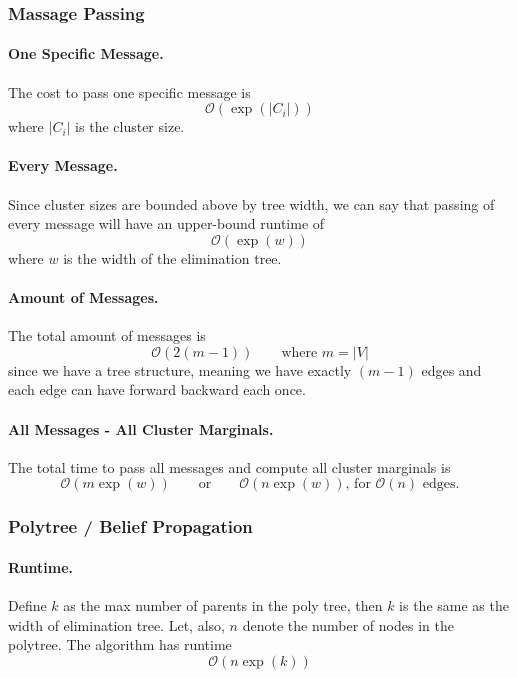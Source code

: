 \documentclass[11pt]{article}
\begin{document}
\subsubsection{Massage Passing}
\paragraph{One Specific Message.} The cost to pass one specific message is
\begin{equation}
	\mathcal O (\exp ( |C_i|)) 
\end{equation}
where $|C_i|$ is the cluster size. 

\paragraph{Every Message.} Since cluster sizes are bounded above by tree width, we can say that passing of every message will have an upper-bound runtime of
\begin{equation}
	\mathcal O ( \exp (w) )
\end{equation}
where $w$ is the width of the elimination tree. 

\paragraph{Amount of Messages.} The total amount of messages is 
\begin{equation}
	\mathcal O (2 (m - 1)) \quad \quad \text{where $m = |V|$}
\end{equation}
since we have a tree structure, meaning we have exactly $(m - 1)$ edges and each edge can have forward backward each once. 

\paragraph{All Messages - All Cluster Marginals.} The total time to pass all messages and compute all cluster marginals is 
\begin{equation}
	\mathcal O (m \exp (w)) \quad \quad \text{or} \quad \quad \mathcal O (n \exp( w))\text{, for $\mathcal O (n)$ edges.} 
\end{equation}

\subsubsection{Polytree / Belief Propagation}
\paragraph{Runtime.} Define $k$ as the max number of parents in the poly tree, then $k$ is the same as the width of elimination tree. Let, also, $n$ denote the number of nodes in the polytree. The algorithm has runtime 
\begin{equation}
	\mathcal O (n \exp (k))
\end{equation}
\end{document}
